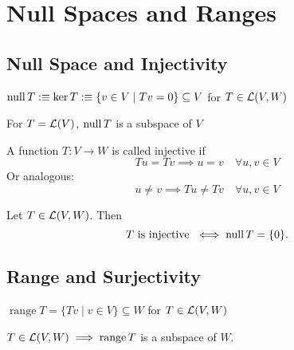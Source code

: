\section{Null Spaces and Ranges}

\subsection{Null Space and Injectivity}

\begin{mydef}
  $\operatorname{null} T :\equiv \ker T :\equiv \{ v \in V \mid Tv=0\} \subseteq V$ for $T \in {\mathcal{L}(V,W)}$
\end{mydef}

\setcounter{thm}{12}
\begin{thm}
  For $T=\mathcal{L}(V)$, $\operatorname{null} T$ is a subspace of $V$ 
\end{thm}

\setcounter{thm}{13}
\begin{mydef}
  A function $T: V \to W$ is called injective if
  \begin{equation}
    Tu = Tv \implies u = v \quad \forall u,v \in V
  \end{equation}
  Or analogous:
  \begin{equation}
    u \neq v \implies Tu \neq Tv \quad \forall u,v \in V
  \end{equation}
\end{mydef}

\setcounter{thm}{14}
\begin{mydef} [inectivity]
  \label{def: injectivity}
  Let $T \in {\mathcal{L}(V,W)}$. Then
  \begin{equation}
    T \text{ is injective } \iff \operatorname{null} T = \{0 \}.
  \end{equation}
\end{mydef}

\subsection{Range and Surjectivity}
\setcounter{thm}{15}
\begin{mydef}
  $\operatorname{range}T= \{Tv \mid v \in V\} \subseteq W$ for $T \in {\mathcal{L}(V,W)}$
\end{mydef}

\setcounter{thm}{17}
\begin{thm}
  $T\in {\mathcal{L}(V,W)} \implies \operatorname{range} T$ is a subspace of $W$.
\end{thm}

